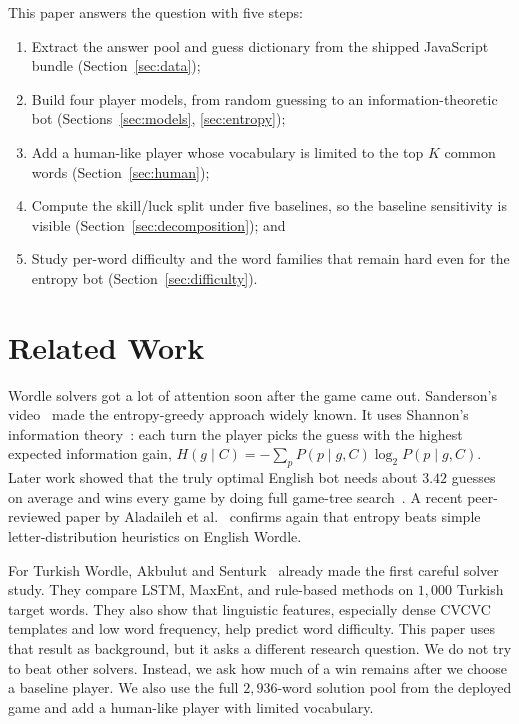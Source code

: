 \documentclass[conference]{IEEEtran}
\begin{document}
This paper answers the question with five steps:
\begin{enumerate}
\item Extract the answer pool and guess dictionary from the shipped
JavaScript bundle (Section~\ref{sec:data});
\item Build four player models, from random guessing to an
information-theoretic bot (Sections~\ref{sec:models}, \ref{sec:entropy});
\item Add a human-like player whose vocabulary is limited to the top
$K$ common words (Section~\ref{sec:human});
\item Compute the skill/luck split under five baselines, so the
baseline sensitivity is visible (Section~\ref{sec:decomposition}); and
\item Study per-word difficulty and the word families that remain hard
even for the entropy bot (Section~\ref{sec:difficulty}).
\end{enumerate}

\section{Related Work}

Wordle solvers got a lot of attention soon after the game came out.
Sanderson's video~\cite{3b1b_wordle} made the entropy-greedy approach
widely known. It uses Shannon's information theory~\cite{shannon1948}:
each turn the player picks the guess with the highest expected
information gain, $H(g \mid C) = -\sum_p P(p \mid g, C) \log_2 P(p \mid g, C)$.
Later work showed that the truly optimal English bot needs about
$3.42$ guesses on average and wins every game by doing full game-tree
search~\cite{bertsimas2022wordle}. A recent peer-reviewed paper by
Aladaileh et al.~\cite{aladaileh2026wordle} confirms again that entropy
beats simple letter-distribution heuristics on English Wordle.

For Turkish Wordle, Akbulut and Senturk~\cite{akbulut2026turkish}
already made the first careful solver study. They compare LSTM, MaxEnt,
and rule-based methods on $1{,}000$ Turkish target words. They also show
that linguistic features, especially dense CVCVC templates and low word
frequency, help predict word difficulty. This paper uses that result as
background, but it asks a different research question. We do not try to
beat other solvers. Instead, we ask how much of a win remains after we
choose a baseline player. We also use the full $2{,}936$-word solution
pool from the deployed game and add a human-like player with limited
vocabulary.
\end{document}

